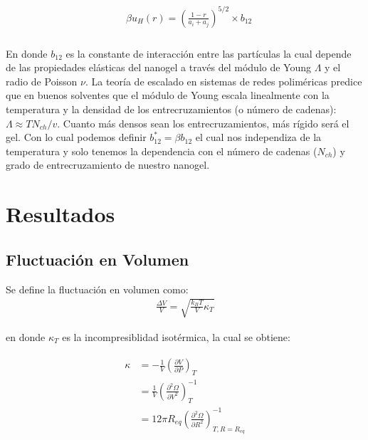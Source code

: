 \begin{align}
	\begin{aligned}
		& \beta u_H (r) = \left(\frac{1-r}{a_i + a_j}\right)^{5/2}\times b_{12} \\
	\end{aligned}
\end{align}


En donde $b_{12}$ es la constante de interacci\'on entre las part\'iculas la cual depende de las propiedades el\'asticas del nanogel a trav\'es del m\'odulo de Young $\Lambda$ y el radio de Poisson $\nu$. \addcite[landau] La teor\'ia de escalado en sistemas de redes polim\'ericas predice que en buenos solventes \addcite que el m\'odulo de Young  escala linealmente con la temperatura y la densidad de los entrecruzamientos (o n\'umero de cadenas): $\Lambda \approx TN_{ch}/v$. Cuanto m\'as densos sean los entrecruzamientos, m\'as r\'igido ser\'a el gel.
Con lo cual podemos definir $b_{12}^\ast = \beta b_{12}$ el cual nos independiza de la temperatura y solo tenemos la dependencia con el n\'umero de cadenas ($N_{ch}$) y grado de entrecruzamiento de nuestro nanogel. 




\section{Resultados}


\subsection{Fluctuaci\'on en Volumen}
Se define la fluctuaci\'on en volumen como:
\begin{align}
	\frac{\Delta V}{V} = \sqrt{\frac{k_BT}{V}\kappa_T}
\end{align}

\noindent en donde $\kappa_T$ es la incompresiblidad isot\'ermica, la cual se obtiene:

\begin{align}
	\begin{aligned}
		\kappa & = -\frac{1}{V} \left( \frac{\partial V}{\partial P}\right)_T \\
		& =\frac{1}{V} \left( \frac{\partial^2 \Omega}{\partial V^2}\right)^{-1}_T \\
		& = 12 \pi R_{eq} \left( \frac{\partial^2 \Omega}{\partial R^2}\right)^{-1}_{T,R=R_{eq}}
	\end{aligned}
\end{align}




